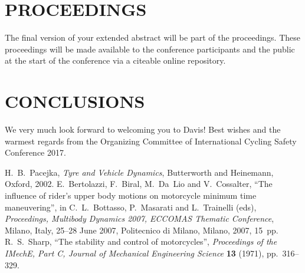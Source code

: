 \documentclass{icsc}
\begin{document}
\section{PROCEEDINGS}
%
The final version of your extended abstract will be part of the proceedings.
These proceedings will be made available to the conference participants and the
public at the start of the conference via a citeable online repository.

\section{CONCLUSIONS}
%
We very much look forward to welcoming you to Davis! Best wishes and the
warmest regards from the Organizing Committee of International Cycling Safety
Conference 2017.

\begin{thebibliography}{6}
   H.~B.~Pacejka, \textit{Tyre and Vehicle Dynamics},
    Butterworth and Heinemann, Oxford, 2002.
   E.~Bertolazzi, F.~Biral, M.~Da~Lio and V.~Cossalter, ``The
    influence of rider's upper body motions on motorcycle minimum time
    maneuvering'', in C.~L.~Bottasso, P.~Masarati and L.~Trainelli (eds),
    \textit{Proceedings, Multibody Dynamics 2007, ECCOMAS Thematic Conference},
    Milano, Italy, 25--28 June 2007, Politecnico di Milano, Milano, 2007,
    15~pp.
   R.~S.~Sharp, ``The stability and control of motorcycles'',
    \textit{Proceedings of the IMechE, Part C, Journal of Mechanical
    Engineering Science} \textbf{13} (1971), pp.~316--329.
\end{thebibliography}
\end{document}
